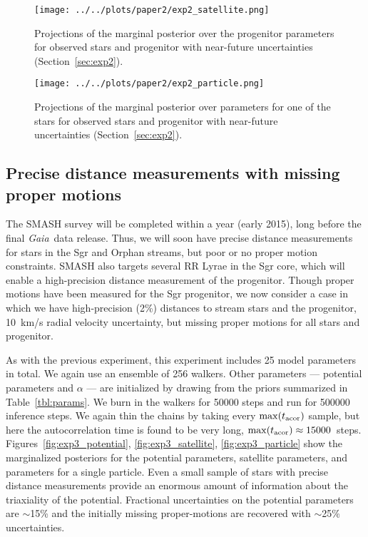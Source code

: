\documentclass[letterpaper,12pt,preprint]{aastex}
\newcommand{\project}[1]{\textsl{#1}}
\newcommand{\gaia}{\project{Gaia}}
\newcommand{\Loffset}{\alpha}
\begin{document}
\begin{figure*}[!h]
\begin{center}
\texttt{[image: ../../plots/paper2/exp2\_satellite.png]}
\caption{ Projections of the marginal posterior over the progenitor parameters for observed stars and progenitor with near-future uncertainties (Section~\ref{sec:exp2}). }\label{fig:exp2_satellite}
\end{center}
\end{figure*}

\begin{figure*}[!h]
\begin{center}
\texttt{[image: ../../plots/paper2/exp2\_particle.png]}
\caption{ Projections of the marginal posterior over parameters for one of the stars for observed stars and progenitor with near-future uncertainties (Section~\ref{sec:exp2}).   }\label{fig:exp2_particle}
\end{center}
\end{figure*}

\subsection{Precise distance measurements with missing proper motions}\label{sec:exp3}
The SMASH survey \citep{smashprop} will be completed within a year (early 2015), long before the final \gaia\, data release. Thus, we will soon have precise distance measurements for stars in the Sgr and Orphan streams, but poor or no proper motion constraints. SMASH also targets several RR Lyrae in the Sgr core, which will enable a high-precision distance measurement of the progenitor. Though proper motions have been measured for the Sgr progenitor, we now consider a case in which we have high-precision (2\%) distances to stream stars and the progenitor, 10~km/s radial velocity uncertainty, but missing proper motions for all stars and progenitor. 

As with the previous experiment, this experiment includes 25 model parameters in total. We again use an ensemble of 256 walkers. Other parameters --- potential parameters and $\Loffset$ --- are initialized by drawing from the priors summarized in Table~\ref{tbl:params}. We burn in the walkers for 50000 steps and run for 500000 inference steps. We again thin the chains by taking every $\max(t_{\rm acor})$ sample, but here the autocorrelation time is found to be very long, $\max(t_{\rm acor}) \approx 15000$~steps. Figures~\ref{fig:exp3_potential}, \ref{fig:exp3_satellite}, \ref{fig:exp3_particle} show the marginalized posteriors for the potential parameters, satellite parameters, and parameters for a single particle. Even a small sample of stars with precise distance measurements provide an enormous amount of information about the triaxiality of the potential. Fractional uncertainties on the potential parameters are $\sim$15\% and the initially missing proper-motions are recovered with $\sim$25\% uncertainties.
\end{document}
